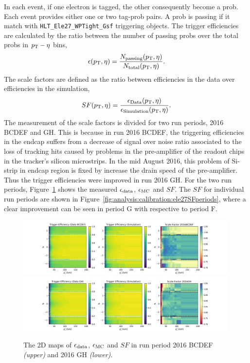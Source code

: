 In each event, if one electron is tagged, the other consequently become a prob. Each event provides either one or two tag-prob pairs. A prob is passing if it match with \texttt{HLT\_Ele27\_WPTight\_Gsf} triggering objects. The trigger efficiencies are calculated by the ratio between the number of passing probs over the total probs in $p_{\mathrm{T}}-\eta$ bins, 
\begin{equation*}
    \epsilon (p_{\mathrm{T}}, \eta) = \frac{ N_{\rm passing} (p_{\mathrm{T}}, \eta) } {  N_{\rm total} (p_{\mathrm{T}}, \eta) }.
\end{equation*}
\noindent The scale factors are defined as the ratio between efficiencies in the data over efficiencies in the simulation,
\begin{equation}
SF (p_{\mathrm{T}}, \eta) = \frac{\epsilon_{\rm{Data}} (p_{\mathrm{T}}, \eta) }{\epsilon_{\rm{Simulation}} (p_{\mathrm{T}}, \eta) }.
\end{equation}
\noindent The measurement of the scale factors is divided for two run periods, 2016 BCDEF and GH. This is because in run 2016 BCDEF,  the triggering efficiencies in the endcap suffers from a decrease of signal over noise ratio associated to the loss of tracking hits caused by problems in the pre-amplifier of the readout chips in the tracker's silicon microstrips. In the mid August 2016, this problem of Si-strip in endcap region is fixed by increase the drain speed of the pre-amplifier. Thus the trigger efficiencies were improved in run 2016 GH. For the two run periods, Figure~\ref{fig:analysis:calibration:ele27SF} shows the measured $\epsilon_{\rm{data}}$, $\epsilon_{\rm{MC}}$ and $SF$. The $SF$ for individual run periods are shown in Figure~\ref{fig:analysis:calibration:ele27SFperiods}, where a clear improvement can be seen in period G with respective to period F.
\begin{figure}
    \centering
    \includegraphics[width=0.99\textwidth]{chapters/Analysis/sectionCalibration/figures/eTrigger/eff2d_BCDEF.png}
    \includegraphics[width=0.99\textwidth]{chapters/Analysis/sectionCalibration/figures/eTrigger/eff2d_GH.png}
    \caption{The 2D maps of $\epsilon_{\rm{data}}$, $\epsilon_{\rm{MC}}$ and $SF$ in run period 2016 BCDEF \emph{(upper)} and 2016 GH \emph{(lower)}.}
    \label{fig:analysis:calibration:ele27SF}
\end{figure}
